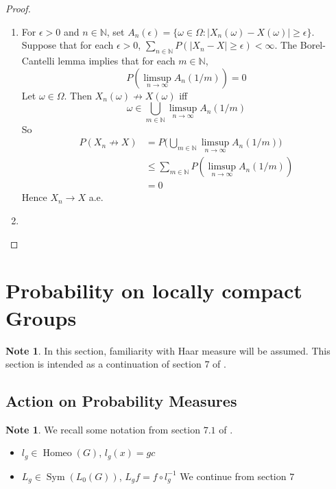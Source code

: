 \documentclass[12pt]{amsart}
\theoremstyle{definition}
\newtheorem{note}[definition]{Note}
\newcommand{\ep}{\epsilon}
\newcommand{\om}{\omega}
\newcommand{\Om}{\Omega}
\newcommand{\N}{\mathbb{N}}
\newcommand{\limpn}{\limsup \limits_{n \rightarrow \infty}}
\DeclareMathOperator{\Homeo}{Homeo}
\DeclareMathOperator{\Sym}{Sym}
\begin{document}
	\begin{proof}\
		\begin{enumerate}
			\item For $\ep>0$ and $n \in \N$, set $A_n(\ep) = \{\om \in \Om: |X_n(\om) - X(\om)| \geq \ep\}$. Suppose that for each $\ep >0 $, $\sum\limits_{n \in \N} P(|X_n - X| \geq \ep) < \infty$.  The Borel-Cantelli lemma implies that for each $m \in \N$,  $$P(\limpn A_n(1/m)) = 0$$
			 Let $\om \in \Om$. Then $X_n(\om) \not \rightarrow X(\om)$ iff $$\om \in \bigcup_{m \in \N} \limpn A_n(1/m)$$ 
		So 
		\begin{align*}
		P(X_n \not \rightarrow X)
		&= P\bigg( \bigcup_{m \in \N} \limpn A_n(1/m) \bigg) \\
		&\leq \sum_{m \in \N}P(\limpn A_n(1/m)) \\
		&= 0
\end{align*}		 
	Hence $X_n \rightarrow X$ a.e.
	\item 
		\end{enumerate}
	\end{proof}
	
	
	
	
	
	
	
	
	
	








	\newpage	
	\section{Probability on locally compact Groups}
	
	\begin{note}
	In this section, familiarity with Haar measure will be assumed. This section is intended as a continuation of section $7$ of \cite{measure}.
	\end{note}
	
	
	\subsection{Action on Probability Measures}
	
	\begin{note}
	We recall some notation from section $7.1$ of \cite{measure}.
	\begin{itemize}
	\item $l_g \in \Homeo(G)$, $l_g(x) = gc$
	\item $L_g \in \Sym(L_0(G))$, $L_g f = f \circ l_g^{-1}$
	We continue from section $7$
	\end{itemize}
	\end{note}
	
\end{document}
